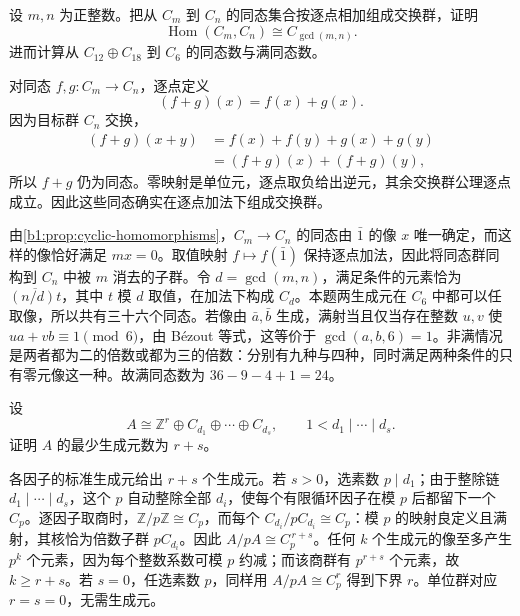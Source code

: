 \begin{exercise}\label{b1:ex:09-cyclic-hom}
	设 \(m,n\) 为正整数。把从 \(C_m\) 到 \(C_n\) 的同态集合按逐点相加组成交换群，证明
	\[
		\operatorname{Hom}(C_m,C_n)\cong C_{\gcd(m,n)}.
	\]
	进而计算从 \(C_{12}\oplus C_{18}\) 到 \(C_6\) 的同态数与满同态数。
\end{exercise}
\begin{solution}
	对同态 \(f,g:C_m\rightarrow C_n\)，逐点定义
	\[
		(f+g)(x)=f(x)+g(x).
	\]
	因为目标群 \(C_n\) 交换，
	\[
		\begin{aligned}
			(f+g)(x+y) &=f(x)+f(y)+g(x)+g(y)\\
			&=(f+g)(x)+(f+g)(y),
		\end{aligned}
	\]
	所以 \(f+g\) 仍为同态。零映射是单位元，逐点取负给出逆元，其余交换群公理逐点成立。因此这些同态确实在逐点加法下组成交换群。

	由\cref{b1:prop:cyclic-homomorphisms}，\(C_m\to C_n\) 的同态由 \(\bar1\) 的像 \(x\) 唯一确定，而这样的像恰好满足 \(mx=0\)。取值映射 \(f\mapsto f(\bar1)\) 保持逐点加法，因此将同态群同构到 \(C_n\) 中被 \(m\) 消去的子群。令 \(d=\gcd(m,n)\)，满足条件的元素恰为 \(\overline{(n/d)t}\)，其中 \(t\) 模 \(d\) 取值，在加法下构成 \(C_d\)。本题两生成元在 \(C_6\) 中都可以任取像，所以共有三十六个同态。若像由 \(\bar a,\bar b\) 生成，满射当且仅当存在整数 \(u,v\) 使 \(ua+vb\equiv1\pmod6\)，由 Bézout 等式，这等价于 \(\gcd(a,b,6)=1\)。非满情况是两者都为二的倍数或都为三的倍数：分别有九种与四种，同时满足两种条件的只有零元像这一种。故满同态数为 \(36-9-4+1=24\)。
\end{solution}

\begin{exercise}\label{b1:ex:09-minimal-generators}
	设
	\[
		A\cong\mathbb Z^r\oplus C_{d_1}\oplus\cdots\oplus C_{d_s}, \qquad 1<d_1\mid\cdots\mid d_s.
	\]
	证明 \(A\) 的最少生成元数为 \(r+s\)。
\end{exercise}
\begin{solution}
	各因子的标准生成元给出 \(r+s\) 个生成元。若 \(s>0\)，选素数 \(p\mid d_1\)；由于整除链 \(d_1\mid\cdots\mid d_s\)，这个 \(p\) 自动整除全部 \(d_i\)，使每个有限循环因子在模 \(p\) 后都留下一个 \(C_p\)。逐因子取商时，\(\mathbb Z/p\mathbb Z\cong C_p\)，而每个 \(C_{d_i}/pC_{d_i}\cong C_p\)：模 \(p\) 的映射良定义且满射，其核恰为倍数子群 \(pC_{d_i}\)。因此 \(A/pA\cong C_p^{\,r+s}\)。任何 \(k\) 个生成元的像至多产生 \(p^k\) 个元素，因为每个整数系数可模 \(p\) 约减；而该商群有 \(p^{r+s}\) 个元素，故 \(k\ge r+s\)。若 \(s=0\)，任选素数 \(p\)，同样用 \(A/pA\cong C_p^r\) 得到下界 \(r\)。单位群对应 \(r=s=0\)，无需生成元。
\end{solution}

